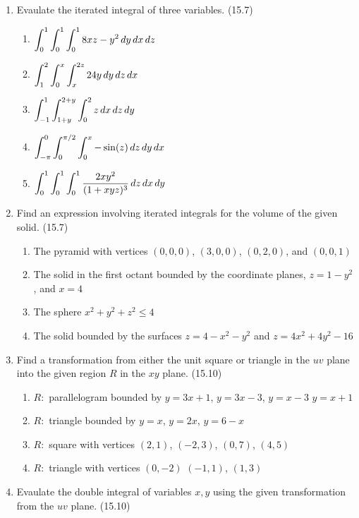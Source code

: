 \begin{enumerate}
    \item Evaulate the iterated integral of three variables. (15.7)

      \begin{enumerate}
        \item $\displaystyle\int_0^1\int_0^1\int_0^1 8xz-y^2\,d{y}\,d{x}\,d{z}$
        \item $\displaystyle\int_1^2\int_0^x\int_x^{2z} 24y\,d{y}\,d{z}\,d{x}$
        \item $\displaystyle\int_{-1}^1\int_{1+y}^{2+y}\int_0^2 z \,d{x}\,d{z}\,d{y}$
        \item $\displaystyle\int_{-\pi}^0\int_0^{\pi/2}\int_0^x -\sin(z) \,d{z}\,d{y}\,d{x}$
        \item $\displaystyle\int_0^1\int_0^1\int_0^1 \frac{2xy^2}{(1+xyz)^3}\,d{z}\,d{x}\,d{y}$
      \end{enumerate}

    \newpage

    \item Find an expression involving iterated integrals for the volume of the given solid. (15.7)

      \begin{enumerate}
        \item The pyramid with vertices $(0,0,0)$, $(3,0,0)$, $(0,2,0)$, and $(0,0,1)$
        \item The solid in the first octant bounded by the coordinate planes, $z=1-y^2$, and $x=4$
        \item The sphere $x^2+y^2+z^2\leq 4$
        \item The solid bounded by the surfaces $z=4-x^2-y^2$ and $z=4x^2+4y^2-16$
      \end{enumerate}

    \item Find a transformation from either the unit square or triangle in the $uv$ plane into the given region $R$ in the $xy$ plane. (15.10)

      \begin{enumerate}
        \item $R:$ parallelogram bounded by $y=3x+1$, $y=3x-3$, $y=x-3$ $y=x+1$
        \item $R:$ triangle bounded by $y=x$, $y=2x$, $y=6-x$
        \item $R:$ square with vertices $(2,1)$, $(-2,3)$, $(0,7)$, $(4,5)$
        \item $R:$ triangle with vertices $(0,-2)$ $(-1,1)$, $(1,3)$
      \end{enumerate}

    \item Evaulate the double integral of variables $x,y$ using the given transformation from the $uv$ plane. (15.10)


\end{enumerate}
